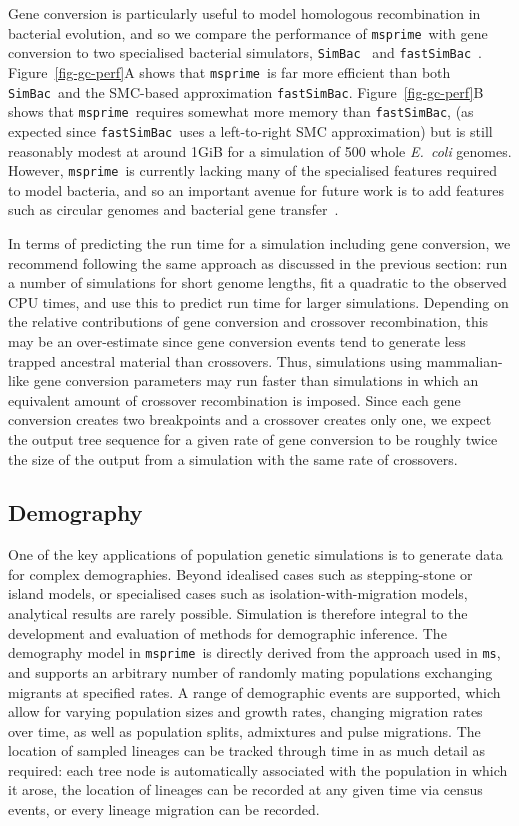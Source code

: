 \documentclass{article}
\newcommand{\msprime}[0]{\texttt{msprime}}
\newcommand{\ms}[0]{\texttt{ms}}
\newcommand{\SimBac}[0]{\texttt{SimBac}}
\newcommand{\FastSimBac}[0]{\texttt{fastSimBac}}
\begin{document}
Gene conversion is particularly useful to model homologous recombination in
bacterial evolution,
and so we compare the performance of \msprime\ with gene conversion to
two specialised bacterial simulators,
\SimBac~\citep{brown2016simbac} and \FastSimBac~\citep{demaio2017the}.
Figure~\ref{fig-gc-perf}A shows that \msprime\ is far more efficient than
both \SimBac\ and the SMC-based approximation \FastSimBac.
Figure~\ref{fig-gc-perf}B shows that \msprime\ requires somewhat more memory
than \FastSimBac, (as expected since \FastSimBac\ uses a left-to-right
SMC approximation) but is still reasonably modest at around 1GiB for a simulation
of 500 whole \emph{E.~coli} genomes.
However, \msprime\ is currently lacking many of the specialised features
required to model bacteria, and so an important avenue for future work
is to add features such as circular genomes
and bacterial gene transfer~\citep{baumdicker2014AGTG}.

In terms of predicting the run time for a simulation including gene conversion,
we recommend following the same approach as discussed in the previous section:
run a number of simulations for short genome lengths, fit a quadratic to the
observed CPU times, and use this to predict run time for larger simulations.
Depending on the relative contributions of gene conversion and crossover
recombination, this may be an over-estimate since gene conversion events
tend to generate less trapped ancestral material than crossovers.
Thus, simulations using mammalian-like gene conversion parameters
may run faster than simulations in which an equivalent amount of
crossover recombination is imposed.
Since each gene conversion creates two breakpoints and a crossover
creates only one, we expect the output tree sequence for a given rate
of gene conversion to be roughly twice the size of the output from a simulation
with the same rate of crossovers.

\subsection*{Demography}
One of the key applications of population genetic simulations is to generate
data for complex demographies. Beyond idealised cases such as stepping-stone or
island models, or specialised cases such as isolation-with-migration models,
analytical results are rarely possible. Simulation is therefore integral to the
development and evaluation of methods for demographic inference. The demography
model in \msprime\ is directly derived from the approach used in \ms, and
supports an arbitrary number of randomly mating populations exchanging migrants
at specified rates. A range of demographic events are supported, which allow for
varying population sizes and growth rates, changing migration rates over time,
as well as population splits, admixtures and pulse migrations.
The location of sampled lineages
can be tracked through time in as much detail as required: each tree node is
automatically associated with the population in which it arose, the location of
lineages can be recorded at any given time via census events, or every lineage
migration can be recorded.
\end{document}
